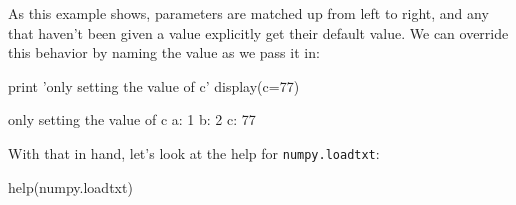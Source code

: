 As this example shows, parameters are matched up from left to right, and
any that haven't been given a value explicitly get their default value.
We can override this behavior by naming the value as we pass it in:

\begin{VerbIn}
print 'only setting the value of c'
display(c=77)
\end{VerbIn}

\begin{VerbOut}
only setting the value of c
a: 1 b: 2 c: 77
\end{VerbOut}

With that in hand, let's look at the help for \texttt{numpy.loadtxt}:

\begin{VerbIn}
help(numpy.loadtxt)
\end{VerbIn}

